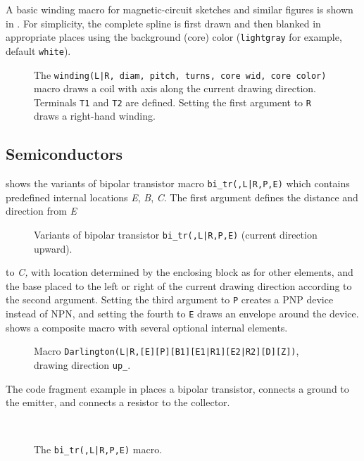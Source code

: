 A basic winding macro for magnetic-circuit sketches and similar figures
is shown in .
For simplicity, the complete spline
is first drawn and then blanked in appropriate places using the background
(core) color (\verb!lightgray! for example, default \verb!white!).
\begin{figure}[h!t]
   \vspace*{-\baselineskip}%
   
   \caption{The {\tt winding(L|R, diam, pitch, turns, core wid, core color)}
     macro draws a coil with axis along the current drawing direction.
     Terminals {\tt T1} and {\tt T2} are defined.
     Setting the first argument to {\tt R} draws a right-hand winding.}
   \label{Windings}
   \end{figure}

\pagebreak
\subsection{Semiconductors\label{Semiconductors:}}%
 shows the variants of bipolar transistor macro
{\tt bi\_tr(\linespec,L|R,P,E)}
which contains predefined internal locations {\sl E},
{\sl B}, {\sl C}.
The first argument defines the distance and direction from {\sl E}
\begin{figure}[ht]
   
   \caption{Variants of bipolar transistor {\tt bi\_tr(\linespec,L|R,P,E)}
    (current direction upward).}
   \label{Bip}
   \end{figure}
to {\sl C,} with location determined by the enclosing
block as for other elements, and the base placed
to the left or right of the
current drawing direction according to the second argument.  Setting the third
argument to {\tt P} creates a PNP device instead of NPN, and setting the
fourth to {\tt E} draws an envelope around the device.
 shows a composite macro with several optional internal elements.
\begin{figure}[h!t]
   
   \caption{Macro {\tt Darlington(L|R,[E][P][B1][E1|R1][E2|R2][D][Z])},
     drawing direction {\tt up\_}.}
   \label{Darlington}
   \end{figure}

The code fragment example in  places a bipolar transistor,
connects a ground to the emitter, and connects a resistor to the collector.
\begin{figure}[h!t]
   \quad\quad\parbox{4in}{\small }%
   \quad\raise-0.4in\hbox{ }%
   \vspace{-\baselineskip}
   \caption{The {\tt bi\_tr(\linespec,L|R,P,E)} macro.}
   \label{bitr}
   \end{figure}

